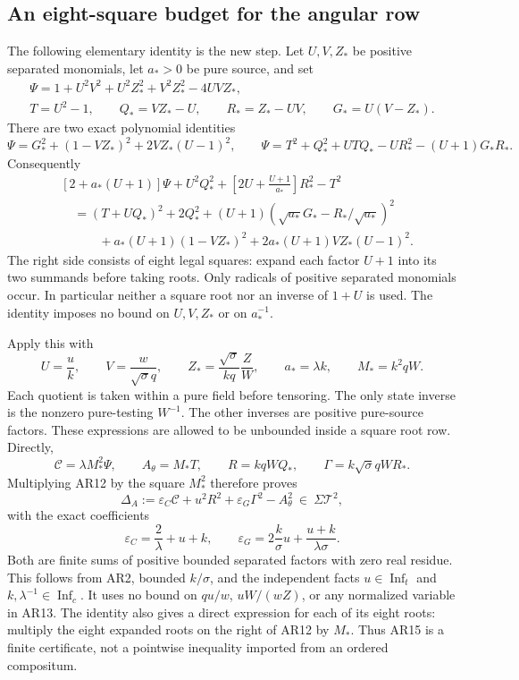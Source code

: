 \subsection{An eight-square budget for the angular row}

The following elementary identity is the new step. Let $U,V,Z_*$
be positive separated monomials, let $a_*>0$ be pure source, and set
\[
 \begin{gathered}
 \Psi=1+U^2V^2+U^2Z_*^2+V^2Z_*^2-4UVZ_*,\\
 T=U^2-1,\qquad Q_*=VZ_*-U,\qquad
 R_*=Z_*-UV,\qquad G_*=U(V-Z_*).
 \end{gathered} \tag{AR10}
\]
There are two exact polynomial identities
\[
 \Psi=G_*^2+(1-VZ_*)^2+2VZ_*(U-1)^2,
 \qquad
 \Psi=T^2+Q_*^2+UTQ_*-UR_*^2-(U+1)G_*R_*.
 \tag{AR11}
\]
Consequently
\[
\boxed{\begin{aligned}
 &[2+a_*(U+1)]\Psi+U^2Q_*^2
       +\left[2U+\frac{U+1}{a_*}\right]R_*^2-T^2\\
 &\quad=(T+UQ_*)^2+2Q_*^2
       +(U+1)\left(\sqrt{a_*}G_*
                          -R_*/\sqrt{a_*}\right)^2\\
 &\qquad\quad+a_*(U+1)(1-VZ_*)^2
                     +2a_*(U+1)VZ_*(U-1)^2.
\end{aligned}} \tag{AR12}
\]
The right side consists of eight legal squares: expand each
factor $U+1$ into its two summands before taking roots. Only
radicals of positive separated monomials occur. In particular
neither a square root nor an inverse of $1+U$ is used. The
identity imposes no bound on $U,V,Z_*$ or on $a_*^{-1}$.

Apply this with
\[
 U=\frac uk,\qquad V=\frac w{\sqrt\sigma q},\qquad
 Z_* =\frac{\sqrt\sigma}{kq}\frac ZW,
 \qquad a_*=\lambda k,\qquad M_*=k^2qW.
 \tag{AR13}
\]
Each quotient is taken within a pure field before tensoring.
The only state inverse is the nonzero pure-testing $W^{-1}$.
The other inverses are positive pure-source factors. These
expressions are allowed to be unbounded inside a square root row.
Directly,
\[
 \mathscr C=\lambda M_*^2\Psi,\qquad
 A_\theta=M_*T,\qquad R=kqWQ_*,\qquad
 \Gamma=k\sqrt\sigma qWR_*.
 \tag{AR14}
\]
Multiplying AR12 by the square $M_*^2$ therefore proves
\[
\boxed{\quad
 \Delta_A:=\varepsilon_C\mathscr C+u^2R^2
                 +\varepsilon_G\Gamma^2-A_\theta^2
                         \ \in\ \Sigma\mathcal T^2,
 \quad} \tag{AR15}
\]
with the exact coefficients
\[
 \varepsilon_C=\frac2\lambda+u+k,\qquad
 \varepsilon_G=2\frac k\sigma u+
                         \frac{u+k}{\lambda\sigma}.
 \tag{AR16}
\]
Both are finite sums of positive bounded separated factors with
zero real residue. This follows from AR2, bounded $k/\sigma$,
and the independent facts $u\in\operatorname{Inf}_t$ and
$k,\lambda^{-1}\in\operatorname{Inf}_c$. It uses no bound on
$q u/w$, $uW/(wZ)$, or any normalized variable in AR13.
The identity also gives a direct expression for each of its eight
roots: multiply the eight expanded roots on the right of AR12
by $M_*$. Thus AR15 is a finite certificate, not a pointwise
inequality imported from an ordered compositum.

